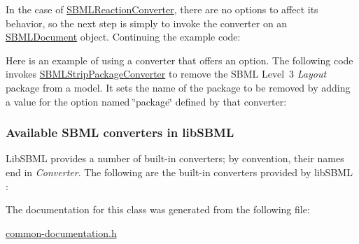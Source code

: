 In the case of \hyperlink{class_s_b_m_l_reaction_converter}{S\+B\+M\+L\+Reaction\+Converter}, there are no options to affect its behavior, so the next step is simply to invoke the converter on an \hyperlink{class_s_b_m_l_document}{S\+B\+M\+L\+Document} object. Continuing the example code\+:

Here is an example of using a converter that offers an option. The following code invokes \hyperlink{class_s_b_m_l_strip_package_converter}{S\+B\+M\+L\+Strip\+Package\+Converter} to remove the S\+B\+ML Level~3 {\itshape Layout} package from a model. It sets the name of the package to be removed by adding a value for the option named {\ttfamily \char`\"{}package\char`\"{}} defined by that converter\+:\hypertarget{classdoc__section__using__sbml__converters_available-converters}{}\subsubsection{Available S\+B\+M\+L converters in lib\+S\+B\+ML}\label{classdoc__section__using__sbml__converters_available-converters}
Lib\+S\+B\+ML provides a number of built-\/in converters; by convention, their names end in {\itshape Converter}. The following are the built-\/in converters provided by lib\+S\+B\+ML \+:

The documentation for this class was generated from the following file\+:\begin{DoxyCompactItemize}
\item 
\hyperlink{common-documentation_8h}{common-\/documentation.\+h}\end{DoxyCompactItemize}
